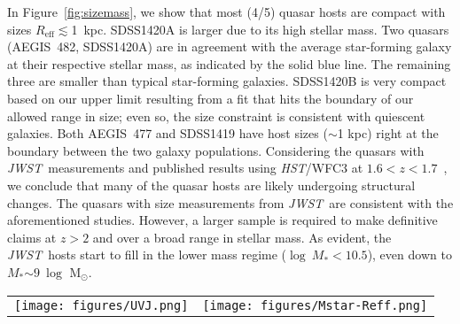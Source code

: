 \documentclass[twocolumn]{aastex631}
\newcommand{\sersic}{S\'ersic}
\newcommand{\reff}{{$R_{\mathrm{eff}}$}}
\newcommand{\smass}{{$M_*$}}
\newcommand{\hst}{{\it HST}}
\newcommand{\jwst}{{\it JWST}}
\newcommand{\angstrom}{\text{\normalfont\AA}}
\begin{document}
In Figure~\ref{fig:sizemass}, we show that most (4/5) quasar hosts are compact with sizes \reff$\lesssim$1~kpc. SDSS1420A is larger due to its high stellar mass. Two quasars (AEGIS~482, SDSS1420A) are in agreement with the average star-forming galaxy at their respective stellar mass, as indicated by the solid blue line. The remaining three are smaller than typical star-forming galaxies. SDSS1420B is very compact based on our upper limit resulting from a fit that hits the boundary of our allowed range in size; even so, the size constraint is consistent with quiescent galaxies. Both AEGIS~477 and SDSS1419 have host sizes ($\sim$1 kpc) right at the boundary between the two galaxy populations. Considering the quasars with \jwst\ measurements and published results using \hst/WFC3 at $1.6<z<1.7$~\citep{Ding2020}, we conclude that many of the quasar hosts are likely undergoing structural changes. The quasars with size measurements from \jwst\ are consistent with the aforementioned studies. However, a larger sample is required to make definitive claims at $z>2$ and over a broad range in stellar mass. As evident, the \jwst\ hosts start to fill in the lower mass regime ($\log~M_*<10.5$), even down to \smass$\sim9~\log$ M$_{\odot}$.    


\begin{figure*}
\centering
\begin{tabular}{c c}
\hspace*{-1cm}  
{\texttt{[image: figures/UVJ.png]}}&
{\texttt{[image: figures/Mstar-Reff.png]}}\\
\end{tabular}
\caption{$Left:$ UVJ diagram for the five quasar systems, together with the sample from CANDELS at $1.6<z<3.5$. Two systems whose 4000~\angstrom\ break is not constrained by \jwst\ are filled in white.
$Right:$ Galaxy size-\smass\ distribution and relations. The \sersic\ index values are presented by the symbol color. For SDSS1420B, \reff\ is labeled using an arrow to indicate an upper limit. We also show the best-fit relation reported in~\citet{vdW+2014} for the star-forming (blue line) and quiescent (red line) at $z\sim2.2$. We also include six broad-line AGNs at $1.6<z<1.7$ from~\citep{Ding2020} based on \hst/WFC3 imaging. 
\label{fig:sizemass}}
\end{figure*}
\end{document}
